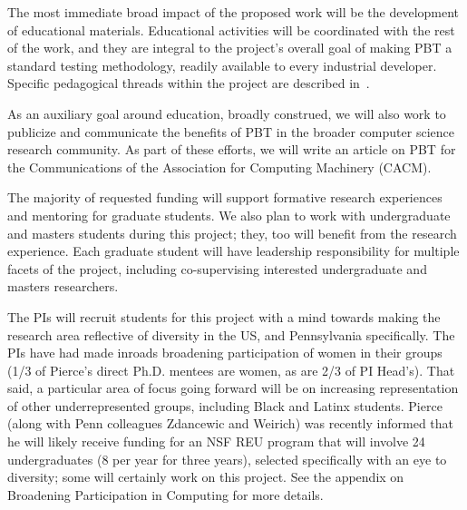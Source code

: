



%
The most immediate broad impact of the proposed work will be the
development of educational materials. Educational activities will be
coordinated with the rest of the work, and they are integral to the
project's overall goal of making PBT a standard testing methodology,
readily available to every industrial developer.  Specific pedagogical
threads within the project are described in~.

As an auxiliary goal around education, broadly construed, we will also work to
publicize and communicate the benefits of PBT in the broader computer science
research community. As part of these efforts, we will write an article on PBT
for the Communications of the Association for Computing Machinery
(CACM). \iflater{}\fi

\smallskip
{}
%
The majority of requested funding will support formative research
experiences and mentoring for graduate students. We
also plan to work with undergraduate and masters students during this project;
they, too will benefit from the research experience. Each graduate
student will have leadership responsibility for multiple facets of the
project, including co-supervising interested undergraduate and masters
researchers.

The PIs will recruit students for this project with a mind towards making
the research area reflective of diversity in the US, and Pennsylvania specifically.
The PIs have had made inroads broadening participation of women in their
groups (1/3 of Pierce's direct Ph.D. mentees are women, as are 2/3 of PI
Head's). That said, a particular area of focus going forward will be on increasing representation of
other underrepresented groups, including Black and Latinx students. Pierce (along with Penn colleagues Zdancewic and Weirich)
was recently informed that he will likely receive funding for an
NSF REU program that will involve 24 undergraduates (8 per
year for three years), selected specifically with an eye to diversity;
some will certainly work on this project. See the appendix on Broadening Participation in Computing for more
details.

